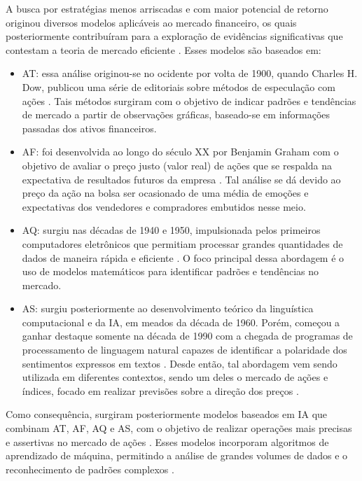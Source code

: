 A busca por estratégias menos arriscadas e com maior potencial de retorno originou diversos modelos aplicáveis ao mercado financeiro, os quais posteriormente contribuíram para a exploração de evidências significativas que contestam a teoria de mercado eficiente \cite{Paul_Proof}. Esses modelos são baseados em:
\begin{itemize}
    \item \ac{AT}: essa análise originou-se no ocidente por volta de 1900, quando Charles H. Dow, publicou uma série de editoriais sobre métodos de especulação com ações \cite{MORRIS1994}. Tais métodos surgiram com o objetivo de indicar padrões e tendências de mercado a partir de observações gráficas, baseado-se em informações passadas dos ativos financeiros. 
    \item \ac{AF}: foi desenvolvida ao longo do século XX por Benjamin Graham \cite{GRAHAM1934} com o objetivo de avaliar o preço justo (valor real) de ações que se respalda na expectativa de resultados futuros da empresa \cite{CAVALCANTE2005}. Tal análise se dá devido ao preço da ação na bolsa ser ocasionado de uma média de emoções e expectativas dos vendedores e compradores embutidos nesse meio. 
    \item \ac{AQ}: surgiu nas décadas de 1940 e 1950, impulsionada pelos primeiros computadores eletrônicos que permitiam processar grandes quantidades de dados de maneira rápida e eficiente \cite{TING2015}. O foco principal dessa abordagem é o uso de modelos matemáticos para identificar padrões e tendências no mercado.   
    \item \ac{AS}: surgiu posteriormente ao desenvolvimento teórico da linguística computacional e da \ac{IA}, em meados da década de 1960. Porém, começou a ganhar destaque somente na década de 1990 com a chegada de programas de processamento de linguagem natural capazes de identificar a polaridade dos sentimentos expressos em textos \cite{SENTIMENTALWILLSON}. Desde então, tal abordagem vem sendo utilizada em diferentes contextos, sendo um deles o mercado de ações e índices, focado em realizar previsões sobre a direção dos preços \cite{SENTIMENTAL2, SENTIMENTAL1, SENTIMENTAL3}. 
\end{itemize}

Como consequência, surgiram posteriormente modelos baseados em \ac{IA} que combinam \ac{AT}, \ac{AF}, \ac{AQ} e \ac{AS}, com o objetivo de realizar operações mais precisas e assertivas no mercado de ações \cite{agrawal2022stock}. Esses modelos incorporam algoritmos de aprendizado de máquina, permitindo a análise de grandes volumes de dados e o reconhecimento de padrões complexos \cite{vadlamudi2017stock}.

